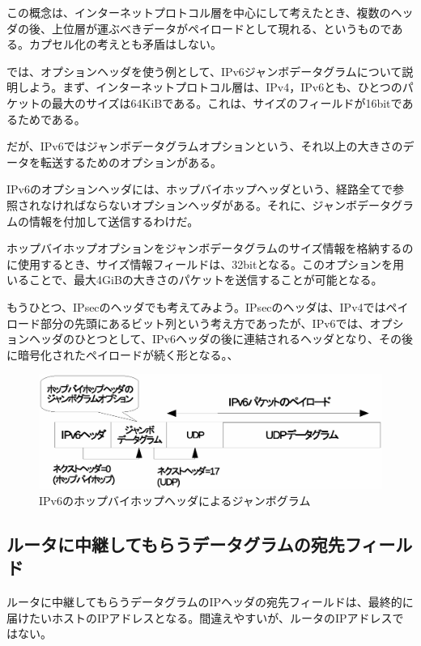 この概念は、インターネットプロトコル層を中心にして考えたとき、複数のヘッダの後、上位層が運ぶべきデータがペイロードとして現れる、というものである。カプセル化の考えとも矛盾はしない。

では、オプションヘッダを使う例として、IPv6ジャンボデータグラムについて説明しよう。まず、インターネットプロトコル層は、IPv4，IPv6とも、ひとつのパケットの最大のサイズは64KiBである。これは、サイズのフィールドが16bitであるためである。

だが、IPv6ではジャンボデータグラムオプションという、それ以上の大きさのデータを転送するためのオプションがある。

IPv6のオプションヘッダには、ホップバイホップヘッダという、経路全てで参照されなければならないオプションヘッダがある。それに、ジャンボデータグラムの情報を付加して送信するわけだ。

ホップバイホップオプションをジャンボデータグラムのサイズ情報を格納するのに使用するとき、サイズ情報フィールドは、32bitとなる。このオプションを用いることで、最大4GiBの大きさのパケットを送信することが可能となる。

もうひとつ、IPsecのヘッダでも考えてみよう。IPsecのヘッダは、IPv4ではペイロード部分の先頭にあるビット列という考え方であったが、IPv6では、オプションヘッダのひとつとして、IPv6ヘッダの後に連結されるヘッダとなり、その後に暗号化されたペイロードが続く形となる。、

\begin{figure}
	\includegraphics[width=14cm,clip]{draw/nextheader2.eps}
	\caption{IPv6のホップバイホップヘッダによるジャンボグラム}
	\label{fig:ipv6jumbogram}
\end{figure}


\subsection{ルータに中継してもらうデータグラムの宛先フィールド}

ルータに中継してもらうデータグラムのIPヘッダの宛先フィールドは、最終的に届けたいホストのIPアドレスとなる。間違えやすいが、ルータのIPアドレスではない。


